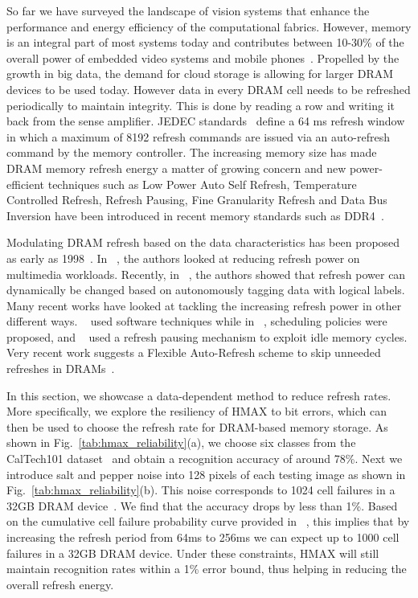So far we have surveyed the landscape of vision systems that enhance the 
performance and energy efficiency of the computational fabrics. 
However, memory is an integral part of most systems today and contributes 
between 10-30\% of the overall power of embedded video systems and 
mobile phones~\cite{CarrollAaronHeiser2010}. Propelled by the growth in big data, the demand for cloud storage is allowing for larger DRAM devices to be used today. 
However data in every DRAM cell needs to be refreshed periodically to maintain integrity. This is done by reading a row and writing it back 
from the sense amplifier. JEDEC standards~\cite{jedec-sdram-standards} define a 64 ms refresh window in which a maximum of 8192 refresh commands are issued via an auto-refresh command by the memory controller. 
The increasing memory size has made DRAM memory refresh energy a matter of growing concern and new 
power-efficient techniques such as Low Power Auto Self Refresh, Temperature Controlled Refresh, Refresh Pausing, Fine Granularity Refresh and Data Bus 
Inversion have been introduced in recent memory standards such as DDR4~\cite{jedec-sdram-standards}.

Modulating DRAM refresh based on the data characteristics has been proposed as early as 1998~\cite{islped98}.  
In ~\cite{Liu2011}, the authors looked at reducing refresh power on multimedia workloads. Recently, in ~\cite{iccd2014}, the authors showed that 
refresh power can dynamically be changed based on autonomously tagging data with logical labels.
Many recent works have looked at tackling the increasing refresh power in other 
different ways. ~\cite{Liu2012} used software techniques while in ~\cite{Stuecheli2010}, scheduling 
policies were proposed, and ~\cite{Nair2013} used a refresh pausing mechanism to
exploit idle memory cycles.
Very recent work suggests a Flexible Auto-Refresh scheme to 
skip unneeded refreshes in DRAMs~\cite{isca2015}.

In this section, we showcase a data-dependent method to reduce refresh rates. 
More specifically, we explore the resiliency of HMAX to bit errors, which can then be used to choose the refresh rate for DRAM-based memory storage.  
As shown in Fig.~\ref{tab:hmax_reliability}(a), we choose six classes from the CalTech101 dataset~\cite{Fergus2004} 
and obtain a recognition accuracy of around 78\%. Next we introduce salt and pepper noise into 128 pixels of each testing image 
as shown in Fig.~\ref{tab:hmax_reliability}(b). This noise corresponds to 1024 cell failures in a 32GB DRAM device~\cite{Liu2012}. 
We find that the accuracy drops by less than 1\%. 
Based on the cumulative cell failure probability curve provided in ~\cite{Liu2012}, this implies 
that by increasing the refresh period from 64ms to 256ms we can expect up to 1000 cell failures in a 32GB DRAM device. Under these constraints, HMAX will 
still maintain recognition rates within a 1\% error bound, thus helping in reducing the overall refresh energy.

